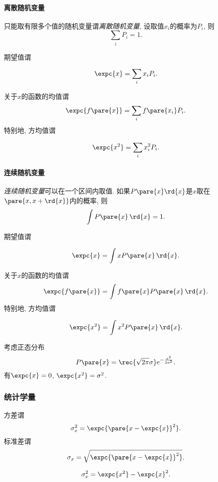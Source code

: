 \documentclass[../Thermal.tex]{subfiles}
\begin{document}
\paragraph{离散随机变量}只能取有限多个值的随机变量谓\emph{离散随机变量}, 设取值$x_i$的概率为$P_i$, 则
\[ \sum_i P_i = 1. \]
\begin{definition}[期望值与方均值]
期望值谓
\begin{finale}
\[ \expc{x} = \sum_i x_i P_i. \]
\end{finale}
关于$x$的函数的均值谓
\[ \expc{f\pare{x}} = \sum_i f\pare{x_i}P_i. \]
特别地, 方均值谓
\begin{finale}
\[ \expc{x^2} = \sum_i x_i^2 P_i. \]
\end{finale}
\end{definition}
\paragraph{连续随机变量}\emph{连续随机变量}可以在一个区间内取值. 如果$P\pare{x}\rd{x}$是$x$取在$\pare{x, x+\rd{x}}$内的概率, 则
\[ \int P\pare{x}\,\rd{x} = 1. \]
\begin{definition}[期望值与方均值]
期望值谓
\begin{finale}
\[ \expc{x} = \int xP\pare{x}\,\rd{x}. \]
\end{finale}
关于$x$的函数的均值谓
\[ \expc{f\pare{x}} = \int f\pare{x}P\pare{x}\,\rd{x}. \]
特别地, 方均值谓
\begin{finale}
\[ \expc{x^2} = \int x^2 P\pare{x}\,\rd{x}. \]
\end{finale}
\end{definition}
\begin{ex}
考虑正态分布
\[ P\pare{x} = \rec{\sqrt{2\pi}\sigma}e^{-\frac{x^2}{2a^2}}. \]
有$\expc{x} = 0$, $\expc{x^2} = \sigma^2$.
\end{ex}
\subsubsection{统计学量}
\begin{finale}
\begin{definition}[方差和标准差]
方差谓
\[ \sigma_x^2 = \expc{\pare{x-\expc{x}}^2}. \]
标准差谓
\[ \sigma_x = \sqrt{\expc{\pare{x-\expc{x}}^2}}. \]
\end{definition}
\end{finale}
\begin{corollary}[方差公式]\quad
\begin{finale}
\[ \sigma_x^2 = \expc{x^2} - \expc{x}^2. \]
\end{finale}
\end{corollary}
\end{document}
